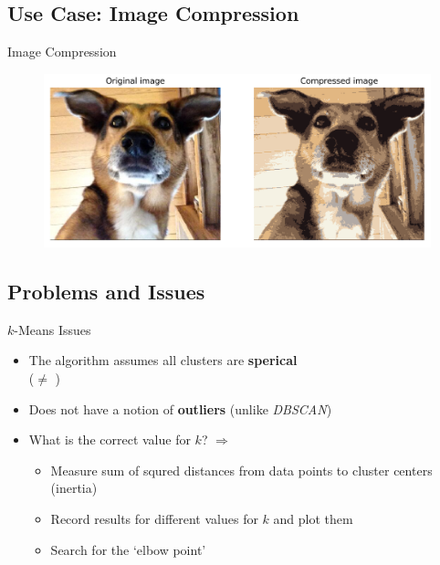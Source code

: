 \subsection{Use Case: Image Compression}

\begin{frame}{Image Compression}{}
	\begin{figure}
		\centering
		\includegraphics[scale=0.3]{12_clustering/02_img/image_compression}
	\end{figure}
\end{frame}


\subsection{Problems and Issues}

\begin{frame}{$k$-Means Issues}{}
	\begin{itemize}
		\item The algorithm assumes all clusters are \textbf{sperical} \\
			($\ne$ )
		\item Does not have a notion of \textbf{outliers} (unlike \textit{DBSCAN})
		\item What is the correct value for $k$? $\Rightarrow$ 
		\begin{itemize}
			\item Measure sum of squred distances from data points to cluster centers (inertia)
			\item Record results for different values for $k$ and plot them
			\item Search for the `elbow point'
		\end{itemize}
	\end{itemize}
\end{frame}


